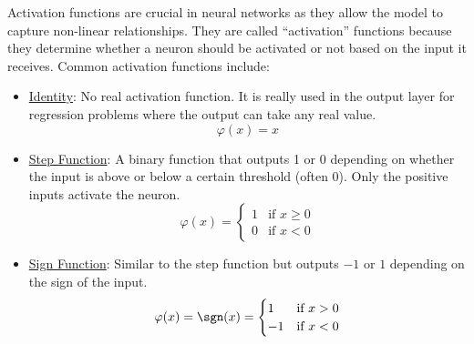 Activation functions are crucial in neural networks as they allow the model to capture non-linear relationships. They are called ``activation'' functions because they determine whether a neuron should be activated or not based on the input it receives. Common activation functions include:
\begin{itemize}
    \item \ul{Identity}: No real activation function. It is really used in the output layer for regression problems where the output can take any real value.
    \begin{equation*}
        \varphi(x) = x
    \end{equation*}
    \item \ul{Step Function}: A binary function that outputs 1 or 0 depending on whether the input is above or below a certain threshold (often 0). Only the positive inputs activate the neuron.
    \begin{equation*}
        \varphi(x) = \begin{cases}
            1 & \text{if } x \geq 0 \\
            0 & \text{if } x < 0
        \end{cases}
    \end{equation*}
    \item \ul{Sign Function}: Similar to the step function but outputs $-1$ or $1$ depending on the sign of the input.
    \begin{equation*}
        \varphi(x) = \sgn(x) = \begin{cases}
            1 & \text{if } x > 0 \\
            -1 & \text{if } x < 0
        \end{cases}
    \end{equation*}


\end{itemize}
